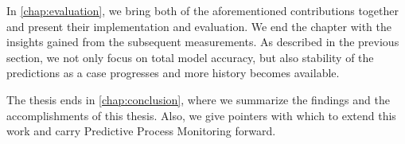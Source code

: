 In \autoref{chap:evaluation}, we bring both of the aforementioned contributions together and present their implementation and evaluation. We end the chapter with the insights gained from the subsequent measurements. As described in the previous section, we not only focus on total model accuracy, but also stability of the predictions as a case progresses and more history becomes available.

The thesis ends in \autoref{chap:conclusion}, where we summarize the findings and the accomplishments of this thesis. Also, we give pointers with which to extend this work and carry Predictive Process Monitoring forward.
